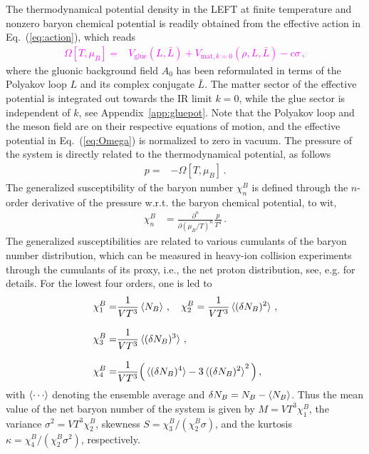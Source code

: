 \documentclass[%
reprint,
superscriptaddress,
showpacs,preprintnumbers,
 amsmath,amssymb,
 aps,
prd,
]{revtex4-1}
\def\Eq#1{Eq.~(\ref{#1})}
\def\app#1{Appendix~\ref{#1}}
\newcommand{\colfab}[1]{\textcolor{magenta}{#1}}
\begin{document}
The thermodynamical potential density in the LEFT at finite temperature and nonzero baryon chemical potential is readily obtained from the effective action in \Eq{eq:action}, which reads
%
\colfab{
\begin{align}
  \Omega[T,\mu_B]=&V_{\mathrm{glue}}(L, \bar L)+V_{\mathrm{mat},k=0}(\rho, L, \bar L)-c\sigma\,,\label{eq:Omega}
\end{align}
}
%
where the gluonic background field $A_0$ has been reformulated in terms of the Polyakov loop $L$ and its complex conjugate $\bar L$. The matter sector of the effective potential is integrated out towards the IR limit $k=0$, while the glue sector is independent of $k$, see \app{app:gluepot}. Note that the Polyakov loop and the meson field are on their respective equations of motion, and the effective potential in \Eq{eq:Omega} is normalized to zero in vacuum. The pressure of the system is directly related to the thermodynamical potential, as follows
%
\begin{align}
  p=&-\Omega[T,\mu_B]\,.\label{eq:pres}
\end{align}
%
The generalized susceptibility of the baryon number $\chi^B_n$ is defined through the $n$-order derivative of the pressure w.r.t. the baryon chemical potential, to wit,
%
\begin{align}
  \chi_n^{B}&=\frac{\partial^n}{\partial (\mu_B/T)^n}\frac{p}{T^4}\,.\label{eq:suscept}
\end{align}
%
The generalized susceptibilities are related to various cumulants of the baryon number distribution, which can be measured in heavy-ion collision experiments through the cumulants of its proxy, i.e., the net proton distribution, see, e.g. \cite{Luo:2017faz} for details. For the lowest four orders, one is led to
%
\begin{align}
\chi^B_1=&\frac{1}{VT^3}\braket{N_B}\,,\quad \chi^B_2=\frac{1}{VT^3}\braket{(\delta N_B)^2}\,,\label{eq:chiB1}\\[2ex]
\chi^B_3=&\frac{1}{VT^3}\braket{(\delta N_B)^3}\,,\\[2ex]
\chi^B_4=&\frac{1}{VT^3}\Big(\braket{(\delta N_B)^4}-3\braket{(\delta N_B)^2}^2\Big)\,,\label{eq:chiB4}
\end{align}
%
with $\braket{\cdots}$ denoting the ensemble average and $\delta N_B=N_B-\braket{N_B}$. Thus the mean value of the net baryon number of the system is given by $M=VT^3\chi_1^{B}$, the variance $\sigma^2=VT^3\chi_2^{B}$, skewness $S=\chi_3^{B}/(\chi_2^{B}\sigma)$, and the kurtosis $\kappa=\chi_4^{B}/(\chi_2^{B}\sigma^2)$, respectively.
\end{document}
